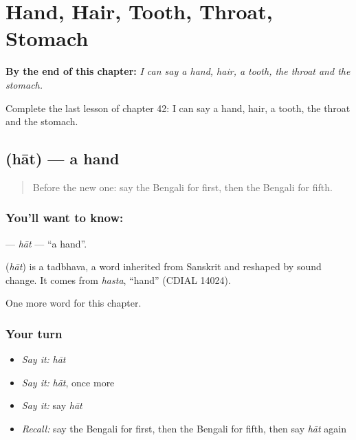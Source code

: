 
\chapter{Hand, Hair, Tooth, Throat, Stomach}
\label{ch:bn-hand-hair-tooth-throat-stomach}

\begin{chapteropening}
\textbf{By the end of this chapter:} \emph{I can say a hand, hair, a tooth, the throat and the stomach.}

Complete the last lesson of chapter 42: I can say a hand, hair, a tooth, the throat and the stomach.
\end{chapteropening}

\section[\texorpdfstring{\bn{হাত} (hāt)}{হাত (hāt)}]{ (hāt) — a hand}

\label{lesson:BN-C42-hat}



\begin{quote}
Before the new one: say the Bengali for first, then the Bengali for fifth.
\end{quote}

\subsection*{You'll want to know: }
\textbf{} — \emph{hāt} — \textquotedblleft{}a hand\textquotedblright{}.

\begin{cousinweb}
\textbf{} (\emph{hāt}) is a tadbhava, a word inherited from Sanskrit and reshaped by sound change. It comes from \emph{hasta}, \textquotedblleft{}hand\textquotedblright{} (CDIAL 14024).
\end{cousinweb}

\begin{grammarlens}[title={What you've built}]
One more word for this chapter.
\end{grammarlens}

\subsection*{Your turn}
\begin{itemize}
\raggedright
  \item \emph{Say it:} \emph{hāt}
  \item \emph{Say it:} \emph{hāt}, once more
  \item \emph{Say it:} say \emph{hāt}
  \item \emph{Recall:} say the Bengali for first, then the Bengali for fifth, then say \emph{hāt} again
\end{itemize}

